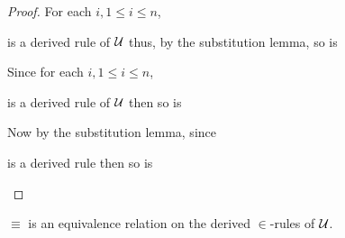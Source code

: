   \begin{proof}
    For each $i, 1 \le i \le n$,
    \begin{mathpar}
    \end{mathpar}
    is a derived rule of $\mathcal{U}$ thus, by the substitution lemma, so is
    \begin{mathpar}
    \end{mathpar}
    Since for each $i, 1 \le i \le n$,
    \begin{mathpar}
    \end{mathpar}
    is a derived rule of $\mathcal{U}$ then so is
    \begin{mathpar}
    \end{mathpar}
    Now by the substitution lemma, since
    \begin{mathpar}
    \end{mathpar}
    is a derived rule then so is
    \begin{mathpar}
    \end{mathpar}
  \end{proof}

  \begin{corollary}
    $\equiv$ is an equivalence relation on the derived $\in$-rules of $\mathcal{U}$.
  \end{corollary}


